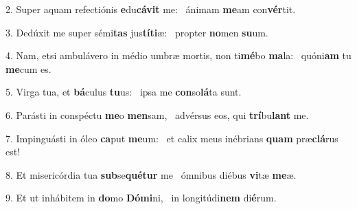 2. Super aquam refectiónis \textbf{e}du\textbf{cá}\textbf{vit} me: \ast\  ánimam \textbf{me}am con\textbf{vér}tit.\

3. Dedúxit me super sémi\textbf{tas} jus\textbf{tí}\textbf{ti}æ: \ast\  propter \textbf{no}men \textbf{su}um.\

4. Nam, etsi ambulávero in médio umbræ mortis, non ti\textbf{mé}bo \textbf{ma}la: \ast\  quóni\textbf{am} tu \textbf{me}cum es.\

5. Virga tua, et \textbf{bá}culus \textbf{tu}us: \ast\  ipsa me \textbf{con}so\textbf{lá}ta sunt.\

6. Parásti in conspéctu \textbf{me}o \textbf{men}sam, \ast\  advérsus eos, qui \textbf{trí}bu\textbf{lant} me.\

7. Impinguásti in óleo \textbf{ca}put \textbf{me}um: \ast\  et calix meus inébrians \textbf{quam} præ\textbf{clá}rus est!\

8. Et misericórdia tua \textbf{sub}se\textbf{qué}\textbf{tur} me \ast\  ómnibus diébus \textbf{vi}tæ \textbf{me}æ.\

9. Et ut inhábitem in \textbf{do}mo \textbf{Dó}\textbf{mi}ni, \ast\  in longitúdi\textbf{nem} di\textbf{é}rum.\


